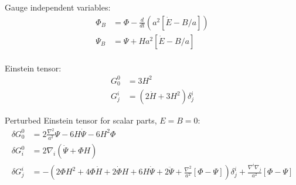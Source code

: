 Gauge independent variables:
\begin{align}
  \Phi_B &=  \Phi - \frac{d}{dt}(a^2[\dot{E}-B/a]) \\
  \Psi_B &=  \Psi + Ha^2[\dot{E}-B/a] \\
\end{align}

Einstein tensor:
\begin{align}
  G^{0}_{0} &= 3 H^2 \\
  G^{i}_{j} &= \left( 2\dot{H} + 3H^2 \right)\delta^{i}_{j}
\end{align}

Perturbed Einstein tensor for scalar parts, $E=B=0$:
\begin{align}
  \delta G^{0}_{0} &= 2\frac{\nabla^2}{a^2} \Psi -6H\dot{\Psi} -6H^2\Phi\\
  \delta G^{0}_{i} &= 2\nabla_i(\dot{\Psi} + \Phi H) \\
  \delta G^{i}_{j} &= -\left( 2 \Phi H^2 +4 \Phi \dot{H} + 2\dot{\Phi}H +6H\dot{\Psi} +2 \ddot{\Psi} + \frac{\nabla^2}{a^2}[\Phi-\Psi] \right)\delta^{i}_{j} + \frac{\nabla^{i}\nabla_{j}}{a^2}[\Phi-\Psi]
\end{align}
